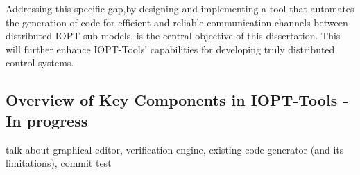 Addressing this specific gap,by designing and implementing a tool that automates the generation of code for efficient and reliable communication channels between distributed IOPT sub-models, is the central objective of this dissertation. This will further enhance IOPT-Tools' capabilities for developing truly distributed control systems.


\subsection{Overview of Key Components in IOPT-Tools - In progress}
\label{sub:iopt_tools_components}

talk about graphical editor, verification engine, existing code generator (and its limitations), commit test 






